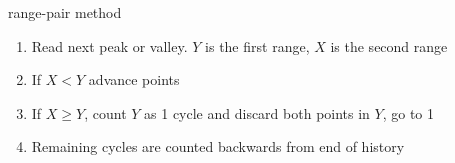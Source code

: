 \documentclass[10pt]{beamer}
\begin{document}
\begin{frame}{range-pair method}
	\begin{enumerate}[<+->]
		\item Read next peak or valley. $Y$ is the first range, $X$ is the second range
		\item If $X < Y$ advance points
		\item If $X \ge Y$, count $Y$ as 1 cycle and discard both points in $Y$, go to 1
		\item Remaining cycles are counted backwards from end of history
	\end{enumerate}
\end{frame}
\end{document}
